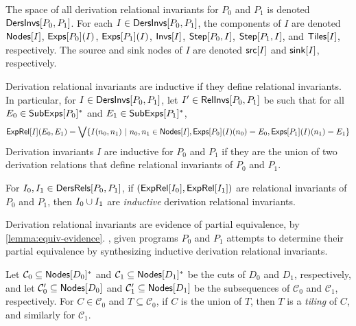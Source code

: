 %
The space of all derivation relational invariants for $P_0$ and $P_1$
is denoted $\mathsf{DersInvs}[ P_0, P_1 ]$.
%
For each $I \in \mathsf{DersInvs}[ P_0, P_1 ]$, the components of $I$ are
denoted $\mathsf{Nodes}[ I ]$, $\mathsf{Exps}[ P_0 ]( I )$, $\mathsf{Exps}[ P_1 ]( I )$,
$\mathsf{Invs}[ I ]$, $\mathsf{Step}[ P_0, I ]$, $\mathsf{Step}[ P_1, I ]$, and
$\mathsf{Tiles}[ I ]$, respectively.
%
The source and sink nodes of $I$ are denoted $\mathsf{src}[ I ]$ and
$\mathsf{sink}[ I ]$, respectively.
%

%
Derivation relational invariants are inductive if they define
relational invariants.
%
In particular, for $I \in \mathsf{DersInvs}[ P_0, P_1 ]$, let $I' \in
\mathsf{RelInvs}[ P_0, P_1 ]$ be such that for all $E_0 \in \mathsf{SubExps}[ P_0 ]^{*}$
and $E_1 \in \mathsf{SubExps}[ P_1 ]^{*}$,
\begin{align*}
  \exprel{I}(E_0, E_1) = %
  \biglor \setformer{ I(n_0, n_1) }{ %
    n_0, n_1 \in \nodes{I},
    \dersexps{P_0}{I}(n_0) = E_0, \dersexps{P_1}{I}(n_1) = E_1 }
\end{align*}
%
Derivation invariants $I$ are inductive for $P_0$ and $P_1$ if they
are the union of two derivation relations that define relational
invariants of $P_0$ and $P_1$.
%
\begin{defn}
  \label{defn:inductive-der-rels}
  For $I_0, I_1 \in \mathsf{DersRels}[ P_0, P_1 ]$, if $(\mathsf{ExpRel}[ I_0 ],
  \mathsf{ExpRel}[ I_1 ])$ are relational invariants of $P_0$ and $P_1$, then
  $I_0 \cup I_1$ are \emph{inductive} derivation relational
  invariants.
\end{defn}
%
Derivation relational invariants are evidence of partial equivalence,
by \autoref{lemma:equiv-evidence}.
%
\sys, given programs $P_0$ and $P_1$ attempts to determine their
partial equivalence by synthesizing inductive derivation relational
invariants.

%
Let $\mathcal{C}_0 \subseteq \mathsf{Nodes}[ D_0 ]^{*}$ and $\mathcal{C}_1
\subseteq \mathsf{Nodes}[ D_1 ]^{*}$ be the cuts of $D_0$ and $D_1$,
respectively, and let $\mathcal{C}_0' \subseteq \mathsf{Nodes}[ D_0 ]$ and
$\mathcal{C}_1' \subseteq \mathsf{Nodes}[ D_1 ]$ be the subsequences of
$\mathcal{C}_0$ and $\mathcal{C}_1$, respectively.
%
For $C \in \mathcal{C}_0$ and $T \subseteq \mathcal{C}_0$, if $C$ is
the union of $T$, then $T$ is a \emph{tiling} of $C$, and similarly
for $\mathcal{C}_1$.

